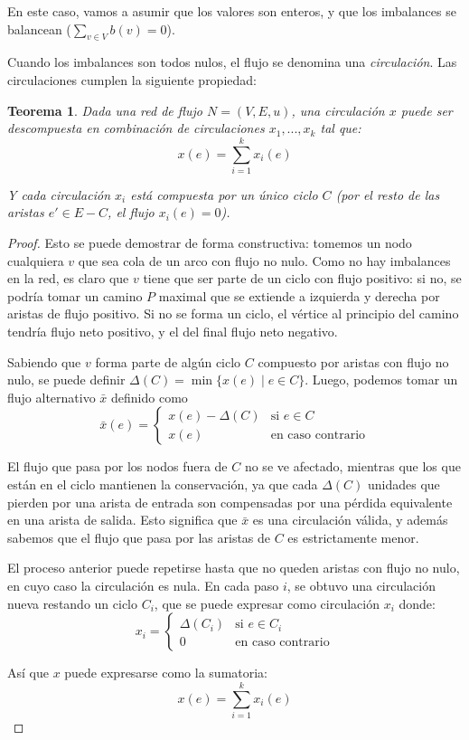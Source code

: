 \documentclass[a4paper]{report}
\newcommand{\si}{\text{si }}
\newcommand{\ecc}{\text{en caso contrario}}
\newtheorem*{theorem*}{Teorema}
\begin{document}
En este caso, vamos a asumir que los valores son enteros, y que los imbalances se balancean ($\sum_{v \in V} b(v) = 0$).

Cuando los imbalances son todos nulos, el flujo se denomina una \textit{circulación}. Las circulaciones cumplen la siguiente propiedad:

\begin{theorem*}
    Dada una red de flujo $N = (V, E, u)$, una circulación $x$ puede ser descompuesta en combinación de circulaciones $x_1, ..., x_k$ tal que:
    $$x(e) = \sum_{i = 1}^k x_i(e)$$

    Y cada circulación $x_i$ está compuesta por un único ciclo $C$ (por el resto de las aristas $e' \in E - C$, el flujo $x_i(e) = 0$).
\end{theorem*}
\begin{proof}
    Esto se puede demostrar de forma constructiva: tomemos un nodo cualquiera $v$ que sea cola de un arco con flujo no nulo. Como no hay imbalances en la red, es claro que $v$ tiene que ser parte de un ciclo con flujo positivo: si no, se podría tomar un camino $P$ maximal que se extiende a izquierda y derecha por aristas de flujo positivo. Si no se forma un ciclo, el vértice al principio del camino tendría flujo neto positivo, y el del final flujo neto negativo.

    Sabiendo que $v$ forma parte de algún ciclo $C$ compuesto por aristas con flujo no nulo, se puede definir $\Delta(C) = \min{\{x(e) \mid e \in C\}}$. Luego, podemos tomar un flujo alternativo $\bar{x}$ definido como
    $$
    \bar{x}(e) =
    \begin{cases}
        x(e) - \Delta(C) & \si e \in C \\
        x(e) & \ecc
    \end{cases}
    $$

    El flujo que pasa por los nodos fuera de $C$ no se ve afectado, mientras que los que están en el ciclo mantienen la conservación, ya que cada $\Delta(C)$ unidades que pierden por una arista de entrada son compensadas por una pérdida equivalente en una arista de salida. Esto significa que $\bar{x}$ es una circulación válida, y además sabemos que el flujo que pasa por las aristas de $C$ es estrictamente menor.

    El proceso anterior puede repetirse hasta que no queden aristas con flujo no nulo, en cuyo caso la circulación es nula. En cada paso $i$, se obtuvo una circulación nueva restando un ciclo $C_i$, que se puede expresar como circulación $x_i$ donde:
    $$
    x_i =
    \begin{cases}
        \Delta(C_i) & \si e \in C_i \\
        0           & \ecc
    \end{cases}
    $$

    Así que $x$ puede expresarse como la sumatoria:
    $$x(e) = \sum_{i = 1}^k x_i(e)$$

\end{proof}
\end{document}
